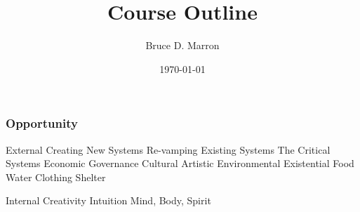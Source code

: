 \documentclass[12pt, letterpaper]{article}
\title{\vspace{-15mm}\fontsize{14pt}{10pt}
                    \selectfont \textbf{Course Outline}   %
                    \vspace{-7mm}
      }
\author{
     \normalsize Bruce D. Marron \\                     %
     \vspace{-5mm}
}
\date{\normalsize \today}
\begin{document}
\begin{singlespacing}
\end{singlespacing}
\thispagestyle{fancy}                           %



\setcounter{subsubsection}{1} %
\subsubsection{Opportunity}

\begin{outline}[enumerate]
\1 External
\2 Creating New Systems
\2 Re-vamping Existing Systems
\2 The Critical Systems
\3 Economic
\3 Governance
\3 Cultural
\3 Artistic
\3 Environmental
\3 Existential
\4 Food
\4 Water
\4 Clothing
\4 Shelter


\1 Internal
\2 Creativity
\2 Intuition
\2 Mind, Body, Spirit

\end{outline}





\clearpage 
\renewcommand{\thepage}{}
\printbibliography
\end{document}
